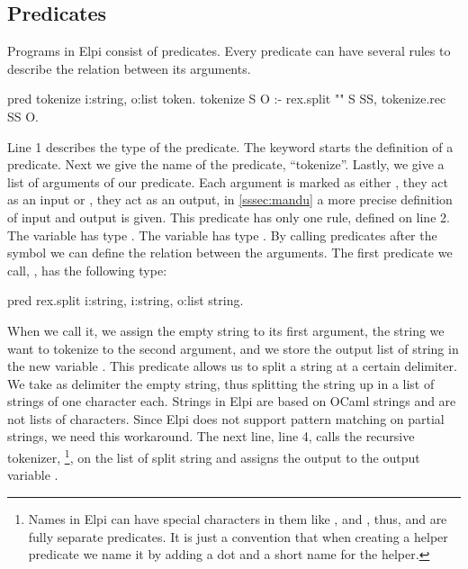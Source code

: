 \documentclass[thesis.tex]{subfiles}
\begin{document}
{{\subsection{Predicates} \label{sssec:predicates}
Programs in Elpi consist of predicates. Every predicate can have several rules to describe the relation between its arguments.
\begin{elpicode}
  pred tokenize i:string, o:list token.
  tokenize S O :- 
    rex.split "" S SS,
    tokenize.rec SS O.
\end{elpicode}
Line 1 describes the type of the predicate. The keyword  starts the definition of a predicate. Next we give the name of the predicate, ``tokenize''. Lastly, we give a list of arguments of our predicate. Each argument is marked as either , they act as an input or , they act as an output, in \cref{sssec:mandu} a more precise definition of input and output is given. This predicate has only one rule, defined on line 2. The variable  has type . The variable  has type . By calling predicates after the \elpii{:-} symbol we can define the relation between the arguments. The first predicate we call, , has the following type:
\begin{elpicode}
  pred rex.split i:string, i:string, o:list string.
\end{elpicode}
When we call it, we assign the empty string to its first argument, the string we want to tokenize to the second argument, and we store the output list of string in the new variable . This predicate allows us to split a string at a certain delimiter. We take as delimiter the empty string, thus splitting the string up in a list of strings of one character each. Strings in Elpi are based on OCaml strings and are not lists of characters. Since Elpi does not support pattern matching on partial strings, we need this workaround. The next line, line 4, calls the recursive tokenizer, \footnote{Names in Elpi can have special characters in them like , \elpii{-} and \elpii{>}, thus,  and  are fully separate predicates. It is just a convention that when creating a helper predicate we name it by adding a dot and a short name for the helper.}, on the list of split string and assigns the output to the output variable .

}}
\end{document}
